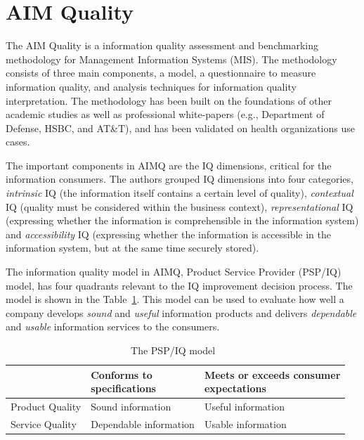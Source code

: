 \section{AIM Quality}

The AIM Quality is a information quality assessment and benchmarking methodology for Management Information Systems (MIS).
The methodology consists of three main components, a model, a questionnaire to measure information quality, and analysis techniques for information quality interpretation.
The methodology has been built on the foundations of other academic studies as well as professional white-papers (e.g., Department of Defense, HSBC, and AT\&T), and has been validated on health organizations use cases.

The important components in AIMQ are the IQ dimensions, critical for the information consumers.
The authors grouped IQ dimensions into four categories, \textit{intrinsic} IQ (the information itself contains a certain level of quality), \textit{contextual} IQ (quality must be considered within the business context), \textit{representational} IQ (expressing whether the information is comprehensible in the information system) and \textit{accessibility} IQ (expressing whether the information is accessible in the information system, but at the same time securely stored).

The information quality model in AIMQ, Product Service Provider (PSP/IQ) model, has four quadrants relevant to the IQ improvement decision process.
The model is shown in the Table~\ref{table:psp-iq}.
This model can be used to evaluate how well a company develops \textit{sound} and \textit{useful} information products and delivers \textit{dependable} and \textit{usable} information services to the consumers.

\begin{table}[htbp]
    \centering

    \begin{tabular}{@{}l|ll@{}}
        \toprule
                        & \shortstack{Conforms to \\ specifications}    & \shortstack{Meets or exceeds consumer \\ expectations}    \\ \midrule
        Product Quality & Sound information                             & Useful information                                        \\
        Service Quality & Dependable information                        & Usable information                                        \\
        \bottomrule
    \end{tabular}

    \caption{The PSP/IQ model~\cite{lee2002}}
    \label{table:psp-iq}
\end{table}
\FloatBarrier


